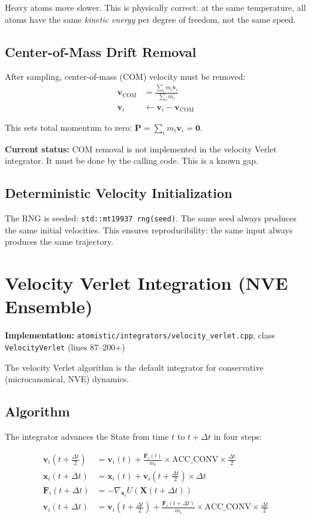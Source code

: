 \documentclass[11pt]{article}
\begin{document}
Heavy atoms move slower. This is physically correct: at the same temperature, all atoms have the same \textit{kinetic energy} per degree of freedom, not the same speed.

\subsection{Center-of-Mass Drift Removal}

After sampling, center-of-mass (COM) velocity must be removed:
\begin{align}
\mathbf{v}_{\text{COM}} &= \frac{\sum_i m_i \mathbf{v}_i}{\sum_i m_i} \\
\mathbf{v}_i &\gets \mathbf{v}_i - \mathbf{v}_{\text{COM}}
\end{align}

This sets total momentum to zero: $\mathbf{P} = \sum_i m_i \mathbf{v}_i = \mathbf{0}$.

\textbf{Current status:} COM removal is not implemented in the velocity Verlet integrator. It must be done by the calling code. This is a known gap.

\subsection{Deterministic Velocity Initialization}

The RNG is seeded: \texttt{std::mt19937 rng(seed)}. The same seed always produces the same initial velocities. This ensures reproducibility: the same input always produces the same trajectory.

\section{Velocity Verlet Integration (NVE Ensemble)}

\textbf{Implementation:} \texttt{atomistic/integrators/velocity\_verlet.cpp}, class \texttt{VelocityVerlet} (lines 87--200+)

The velocity Verlet algorithm is the default integrator for conservative (microcanonical, NVE) dynamics.

\subsection{Algorithm}

The integrator advances the State from time $t$ to $t + \Delta t$ in four steps:

\begin{align}
\mathbf{v}_i\!\left(t + \frac{\Delta t}{2}\right) &= \mathbf{v}_i(t) + \frac{\mathbf{F}_i(t)}{m_i} \times \text{ACC\_CONV} \times \frac{\Delta t}{2} \\
\mathbf{x}_i(t + \Delta t) &= \mathbf{x}_i(t) + \mathbf{v}_i\!\left(t + \frac{\Delta t}{2}\right) \times \Delta t \\
\mathbf{F}_i(t + \Delta t) &= -\nabla_{\mathbf{x}_i} U(\mathbf{X}(t + \Delta t)) \\
\mathbf{v}_i(t + \Delta t) &= \mathbf{v}_i\!\left(t + \frac{\Delta t}{2}\right) + \frac{\mathbf{F}_i(t + \Delta t)}{m_i} \times \text{ACC\_CONV} \times \frac{\Delta t}{2}
\end{align}
\end{document}
